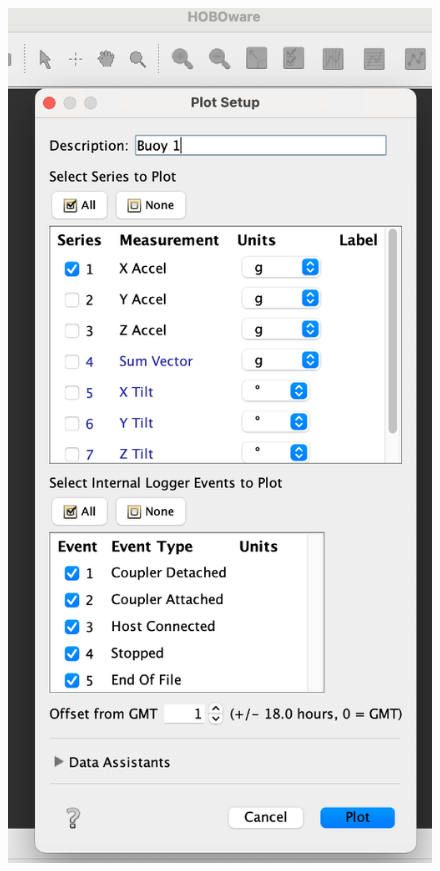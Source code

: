 \documentclass[
  letterpaper,
  DIV=11,
  numbers=noendperiod]{scrreprt}
\begin{document}
\begin{figure}

{\centering \includegraphics{chapters/figs/HOBOExportStep3.png}

}

\end{figure}
\end{document}
